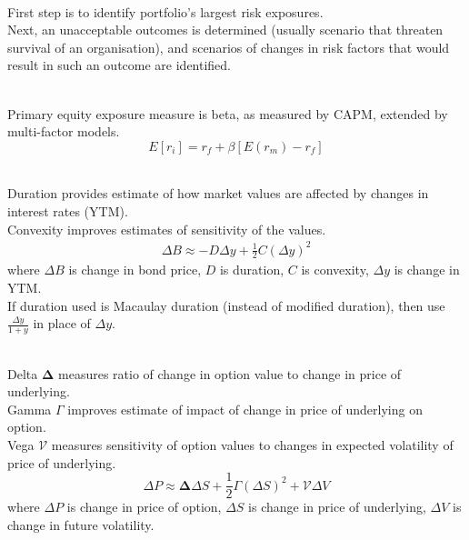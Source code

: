 \begin{remark} \\
First step is to identify portfolio's largest risk exposures.\\
Next, an unacceptable outcomes is determined (usually scenario that threaten survival of an organisation), and scenarios of changes in risk factors that would result in such an outcome are identified.
\end{remark}

\begin{remark} \\
Primary equity exposure measure is beta, as measured by CAPM, extended by multi-factor models.
\begin{equation}
E[r_i] = r_f + \beta[E(r_m) - r_f] \nonumber
\end{equation}
\end{remark}

\begin{remark} \\
Duration provides estimate of how market values are affected by changes in interest rates (YTM).\\
Convexity improves estimates of sensitivity of the values.
\begin{align}
\Delta B \approx -D \Delta y + \frac{1}{2} C (\Delta y)^2 \nonumber
\end{align}
where $\Delta B$ is change in bond price, $D$ is duration, $C$ is convexity, $\Delta y$ is change in YTM.\\
If duration used is Macaulay duration (instead of modified duration), then use $\frac{\Delta y}{1+y}$ in place of $\Delta y$.
\end{remark}

\begin{remark} \\
Delta $\bm{\Delta}$ measures ratio of change in option value to change in price of underlying.\\
Gamma $\Gamma$ improves estimate of impact of change in price of underlying on option.\\
Vega $\mathcal{V}$ measures sensitivity of option values to changes in expected volatility of price of underlying.
\begin{equation}
\Delta P \approx \bm{\Delta} \Delta S + \frac{1}{2} \Gamma (\Delta S)^2 + \mathcal{V} \Delta V \nonumber
\end{equation}
where $\Delta P$ is change in price of option, $\Delta S$ is change in price of underlying, $\Delta V$ is change in future volatility.
\end{remark}

